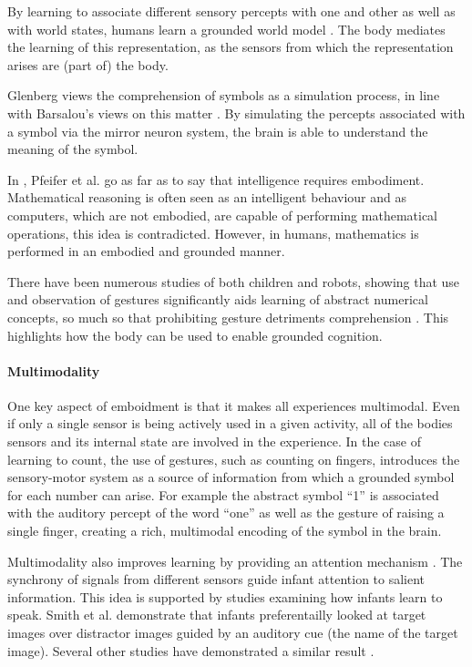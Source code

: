 By learning to associate different sensory percepts with one and other as well as with world states, humans learn a grounded world model \cite{barsalou2008grounded}. The body mediates the learning of this representation, as the sensors from which the representation arises are (part of) the body. 

Glenberg \cite{glenberg2015few} views the comprehension of symbols as a simulation process, in line with Barsalou's views on this matter \cite{barsalou2008grounded}. By simulating the percepts associated with a symbol via the mirror neuron system, the brain is able to understand the meaning of the symbol.


In \cite{pfeifer2006body}, Pfeifer et al. go as far as to say that intelligence requires embodiment. Mathematical reasoning is often seen as an intelligent behaviour and as computers, which are not embodied, are capable of performing mathematical operations, this idea is contradicted. However, in humans, mathematics is performed in an embodied and grounded manner. 

There have been numerous studies of both children and robots, showing that use and observation of gestures significantly aids learning of abstract numerical concepts, so much so that prohibiting gesture detriments comprehension \cite{Goldin-MeadowSusan2015Fata, de2014making, rucinski2012robotic}. This highlights how the body can be used to enable grounded cognition.

\paragraph{Multimodality}
One key aspect of emboidment is that it makes all experiences multimodal. Even if only a single sensor is being actively used in a given activity, all of the bodies sensors and its internal state are involved in the experience. 
In the case of learning to count, the use of gestures, such as counting on fingers, introduces the sensory-motor system as a source of information from which a grounded symbol for each number can arise. For example the abstract symbol ``1'' is associated with the auditory percept of the word ``one'' as well as the gesture of raising a single finger, creating a rich, multimodal encoding of the symbol in the brain. 

Multimodality also improves learning by providing an attention mechanism \cite{bahrick2000intersensory}. The synchrony of signals from different sensors guide infant attention to salient information. This idea is supported by studies examining how infants learn to speak.  Smith et al. \cite{smith2008infants} demonstrate that infants preferentailly looked at target images over distractor images guided by an auditory cue (the name of the target image). Several other studies have demonstrated a similar result \cite{walker2010preverbal, fischer2011multi, scott20122, slater1999intermodal}.


